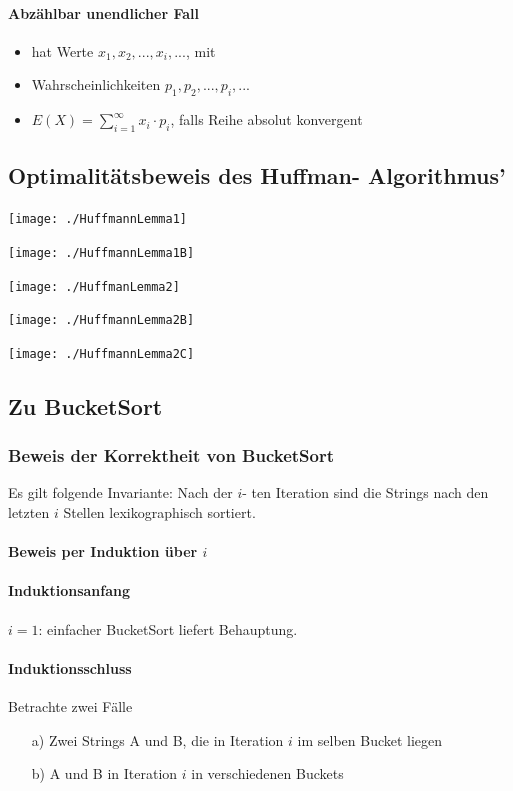 \documentclass[fleqn]{scrartcl}
\begin{document}
\paragraph{Abzählbar unendlicher Fall}
\begin{itemize}
\item hat Werte $x_1, x_2, ..., x_i, ...$, mit
\item Wahrscheinlichkeiten $p_1, p_2, ..., p_i, ...$
\item $E(X) = \sum\limits_{i=1}^{\infty} x_i \cdot p_i$, falls Reihe absolut konvergent
\end{itemize}

\subsection{Optimalitätsbeweis des Huffman- Algorithmus'} 
\begin{center}
\texttt{[image: ./HuffmannLemma1]}
\end{center}
\begin{center}
\texttt{[image: ./HuffmannLemma1B]}
\end{center}
\begin{center}
\texttt{[image: ./HuffmanLemma2]}
\end{center}
\begin{center}
\texttt{[image: ./HuffmannLemma2B]}
\end{center}
\begin{center}
\texttt{[image: ./HuffmannLemma2C]}
\end{center}

\newpage
\subsection{Zu BucketSort}
\subsubsection{Beweis der Korrektheit von BucketSort}
Es gilt folgende Invariante: Nach der $i$- ten Iteration sind die Strings nach den letzten $i$ Stellen lexikographisch sortiert.\\\\
\textbf{Beweis per Induktion über $i$}\\
\paragraph{Induktionsanfang}
$i=1$: einfacher BucketSort liefert Behauptung.
\paragraph{Induktionsschluss} Betrachte zwei Fälle
\begin{itemize}
\item [a)] Zwei Strings A und B, die in Iteration $i$ im selben Bucket liegen
\item[b)] A und B in Iteration $i$ in verschiedenen Buckets
\end{itemize}
\end{document}
